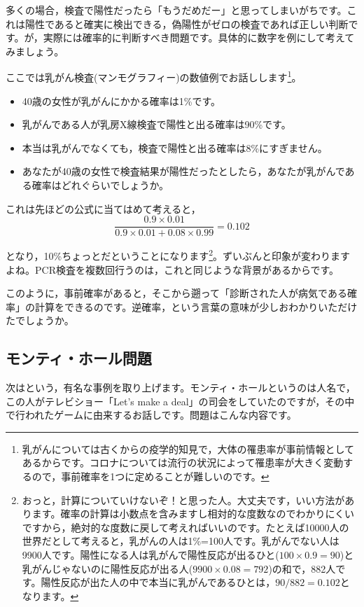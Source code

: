 \documentclass{ltjbook}
\begin{document}
多くの場合，検査で陽性だったら「もうだめだー」と思ってしまいがちです。これは陽性であると確実に検出できる，偽陽性がゼロの検査であれば正しい判断です。が，実際には確率的に判断すべき問題です。具体的に数字を例にして考えてみましょう。

ここでは乳がん検査(マンモグラフィー)の数値例でお話しします\footnote{乳がんについては古くからの疫学的知見で，大体の罹患率が事前情報としてあるからです。コロナについては流行の状況によって罹患率が大きく変動するので，事前確率を1つに定めることが難しいのです。}。
\begin{itemize}
	\item 40歳の女性が乳がんにかかる確率は1\%です。
	\item 乳がんである人が乳房X線検査で陽性と出る確率は90\%です。
	\item 本当は乳がんでなくても，検査で陽性と出る確率は8\%にすぎません。
	\item あなたが40歳の女性で検査結果が陽性だったとしたら，あなたが乳がんである確率はどれぐらいでしょうか。
\end{itemize}
これは先ほどの公式に当てはめて考えると，
\[\frac{0.9\times0.01}{0.9\times0.01+0.08\times0.99}=0.102 \]

となり，10\%ちょっとだということになります\footnote{おっと，計算についていけないぞ！と思った人。大丈夫です，いい方法があります。確率の計算は小数点を含みますし相対的な度数なのでわかりにくいですから，絶対的な度数に戻して考えればいいのです。たとえば10000人の世界だとして考えると，乳がんの人は1\%=100人です。乳がんでない人は9900人です。陽性になる人は乳がんで陽性反応が出るひと($100\times0.9=90$)と乳がんじゃないのに陽性反応が出る人($9900\times0.08=792$)の和で，882人です。陽性反応が出た人の中で本当に乳がんであるひとは，$90/882=0.102$となります。}。ずいぶんと印象が変わりますよね。PCR検査を複数回行うのは，これと同じような背景があるからです。

このように，事前確率があると，そこから遡って「診断された人が病気である確率」の計算をできるのです。逆確率，という言葉の意味が少しおわかりいただけたでしょうか。

\subsection{モンティ・ホール問題}

次はという，有名な事例を取り上げます。モンティ・ホールというのは人名で，この人がテレビショー「Let's make a deal」の司会をしていたのですが，その中で行われたゲームに由来するお話しです。問題はこんな内容です。
\end{document}
